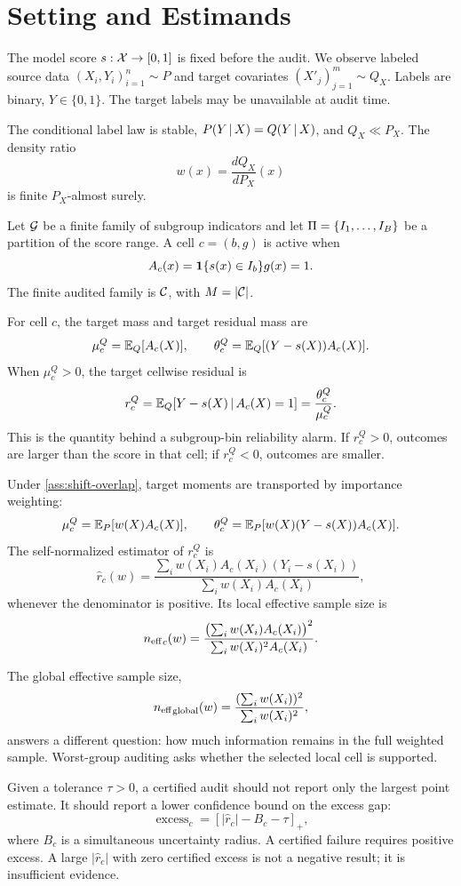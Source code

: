 \section{Setting and Estimands}\label{sec:setting}

The model score \(s:\mathcal{X}\to[0,1]\) is fixed before the audit. We observe labeled source data \((X_i,Y_i)_{i=1}^n\sim P\) and target covariates \((X'_j)_{j=1}^m\sim Q_X\). Labels are binary, \(Y\in\{0,1\}\). The target labels may be unavailable at audit time.

\begin{assumption}\label{ass:shift-overlap}
The conditional label law is stable, \(P(Y\,|\, X)=Q(Y\,|\, X)\), and \(Q_X\ll P_X\). The density ratio
\[
w(x)=\frac{dQ_X}{dP_X}(x)
\]
is finite \(P_X\)-almost surely.
\end{assumption}

Let \(\mathcal{G}\) be a finite family of subgroup indicators and let \(\Pi=\{I_1,\ldots,I_B\}\) be a partition of the score range. A cell \(c=(b,g)\) is active when
\[
A_c(x)=\mathbf{1}\{s(x)\in I_b\}g(x)=1.
\]
The finite audited family is \(\mathcal{C}\), with \(M=|\mathcal{C}|\).

For cell \(c\), the target mass and target residual mass are
\[
\mu_c^Q=\mathbb{E}_Q[A_c(X)],
\qquad
\theta_c^Q=\mathbb{E}_Q[(Y-s(X))A_c(X)].
\]
When \(\mu_c^Q>0\), the target cellwise residual is
\[
r_c^Q
=
\mathbb{E}_Q[Y-s(X)\,|\, A_c(X)=1]
=
\frac{\theta_c^Q}{\mu_c^Q}.
\]
This is the quantity behind a subgroup-bin reliability alarm. If \(r_c^Q>0\), outcomes are larger than the score in that cell; if \(r_c^Q<0\), outcomes are smaller.

Under \cref{ass:shift-overlap}, target moments are transported by importance weighting:
\[
\mu_c^Q=\mathbb{E}_P[w(X)A_c(X)],
\qquad
\theta_c^Q=\mathbb{E}_P[w(X)(Y-s(X))A_c(X)].
\]
The self-normalized estimator of \(r_c^Q\) is
\begin{equation}\label{eq:rhat-main}
\widehat r_c(w)
=
\frac{\sum_i w(X_i)A_c(X_i)(Y_i-s(X_i))}
{\sum_i w(X_i)A_c(X_i)} ,
\end{equation}
whenever the denominator is positive. Its local effective sample size is
\begin{equation}\label{eq:local-ess-main}
{n_{\mathrm{eff}}}_c(w)
=
\frac{\bigl(\sum_i w(X_i)A_c(X_i)\bigr)^2}
{\sum_i w(X_i)^2A_c(X_i)}.
\end{equation}

The global effective sample size,
\[
{n_{\mathrm{eff}}}_{\mathrm{global}}(w)
=
\frac{(\sum_i w(X_i))^2}{\sum_i w(X_i)^2},
\]
answers a different question: how much information remains in the full weighted sample. Worst-group auditing asks whether the selected local cell is supported.

Given a tolerance \(\tau>0\), a certified audit should not report only the largest point estimate. It should report a lower confidence bound on the excess gap:
\[
\operatorname{excess}_c
=
\left[|\widehat r_c|-B_c-\tau\right]_+,
\]
where \(B_c\) is a simultaneous uncertainty radius. A certified failure requires positive excess. A large \(|\widehat r_c|\) with zero certified excess is not a negative result; it is insufficient evidence.
